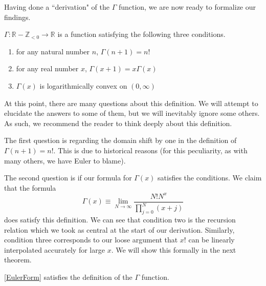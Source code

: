 Having done a ``derivation" of the $\Gamma$ function, we are now ready to formalize our findings.

\begin{defn}\label{BohrMollerupDef}
$\Gamma: \mathbb{R} - \mathbb{Z}_{< 0} \rightarrow \mathbb{R}$ is a function satisfying the following three conditions.
\begin{enumerate}
    \item for any natural number $n$, $\Gamma (n+1) = n!$
    \item for any real number $x$, $\Gamma (x+1) = x \Gamma(x)$
    \item $\Gamma(x)$ is logarithmically convex on $(0, \infty)$
\end{enumerate}
\end{defn}

At this point, there are many questions about this definition.
We will attempt to elucidate the answers to some of them, but we will inevitably ignore some others.
As such, we recommend the reader to think deeply about this definition.

The first question is regarding the domain shift by one in the definition of $\Gamma(n+1) = n!$.
This is due to historical reasons (for this peculiarity, as with many others, we have Euler to blame).

The second question is if our formula for $\Gamma(x)$ satisfies the conditions. 
We claim that the formula
\begin{equation}\label{EulerForm}
\boxed{\Gamma(x) \equiv \lim_{N \rightarrow \infty} \frac{N! N^x}{\prod_{j=0}^N (x+j)}}
\end{equation}
does satisfy this definition.
We can see that condition two is the recursion relation which we took as central at the start of our derivation.
Similarly, condition three corresponds to our loose argument that $x!$ can be linearly interpolated accurately for large $x$.
We will show this formally in the next theorem.

\begin{thm}
\eqref{EulerForm} satisfies the definition of the $\Gamma$ function.
\end{thm}

